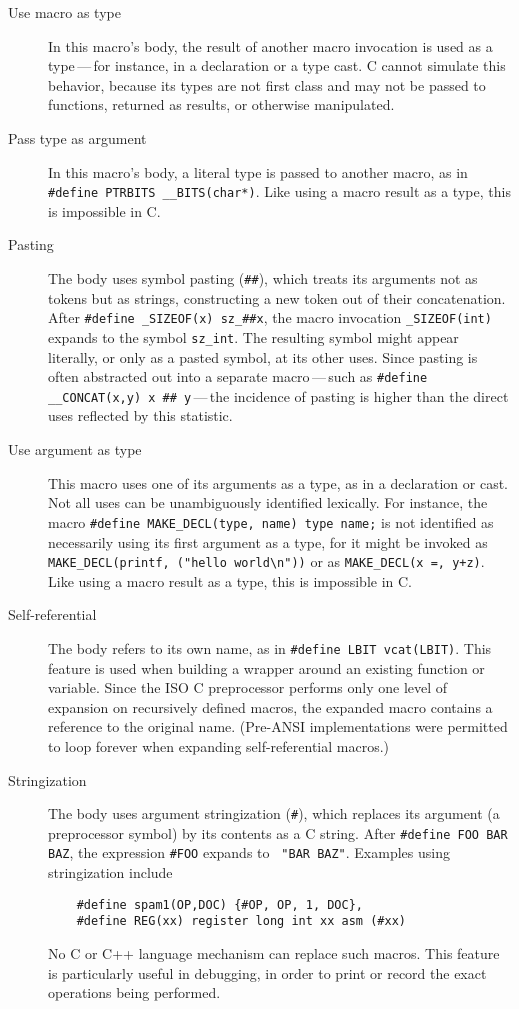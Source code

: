 \documentclass[10pt]{article}
\begin{document}
\begin{description}
\item[Use macro as type]
  In this macro's body, the result of another macro invocation is used as a
  type\,---\,for instance, in a declaration or a type cast.  C cannot
  simulate this behavior, because its types are not first class and may not
  be passed to functions, returned as results, or otherwise manipulated.

\item[Pass type as argument]
  In this macro's body, a literal type is passed to another macro, as in
  {\tt \#define PTRBITS \verb|__BITS|(char*)}.  Like using a macro result
  as a type, this is impossible in C\@.

\item[Pasting]\label{def:pasting}
  The body uses symbol pasting ({\tt \#\#}), which treats its arguments not
  as tokens but as strings, constructing a new token out of their
  concatenation.  After {\tt \#define \verb|_SIZEOF|(x) \verb|sz_|\#\#x},
  the macro invocation {\tt \verb|_SIZEOF|(int)} expands to the 
  symbol {\tt \verb|sz_int|}.  The resulting symbol might appear literally, or
  only as a pasted symbol, at its other uses.  Since pasting is often
  abstracted out into a separate macro\,---\,such as {\tt \#define
  \verb|__CONCAT|(x,y) x \#\# y}\,---\,the incidence of pasting is higher
  than the direct uses reflected by this statistic.

\item[Use argument as type]
  This macro uses one of its arguments as a type, as in a declaration or
  cast.  Not all uses can be unambiguously identified lexically.  For
  instance, the macro {\tt \#define \verb|MAKE_DECL|(type, name) type
  name;} is not identified as necessarily using its first argument as a
type, for it might be invoked as {\tt \verb|MAKE_DECL|(printf, ("hello
world\verb|\|n"))} or as {\tt \verb|MAKE_DECL|(x =, y+z)}.  Like using a
macro result as a type, this is impossible in C\@.

\item[Self-referential]
  The body refers to its own name, as in {\tt \#define LBIT vcat(LBIT)}.
  This feature is used when building a wrapper around an existing function
  or variable.  Since the ISO C preprocessor performs only one level of
  expansion on recursively defined macros, the expanded macro contains a
  reference to the original name.  (Pre-ANSI implementations were permitted
  to loop forever when expanding self-referential macros.)

\item[Stringization]
  The body uses argument stringization ({\tt \#}), which replaces its
  argument (a preprocessor symbol) by its contents as a C string.  After
  {\tt \#define FOO BAR BAZ}, the expression {\tt \#FOO} expands to {\tt
  "BAR~BAZ"}.  Examples using stringization include
\begin{verbatim}
    #define spam1(OP,DOC) {#OP, OP, 1, DOC},
    #define REG(xx) register long int xx asm (#xx)
\end{verbatim}
  No C or C++ language mechanism can replace such macros.  This feature is
  particularly useful in debugging, in order to print or record the exact
  operations being performed.


\end{description}
\end{document}

